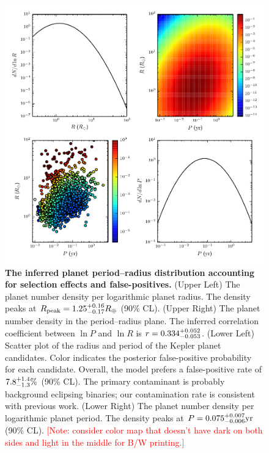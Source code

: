 \documentclass{nature}
\newcommand{\Rpeak}{R_\mathrm{peak}}
\newcommand{\REarth}{R_\oplus}
\newcommand{\ilya}[1]{\textcolor{red}{#1}}
\begin{document}
\begin{figure}
  \includegraphics[width=\columnwidth]{foreground-dist}
  \caption{\label{fig:foreground-dist} \textbf{The inferred planet
      period--radius distribution accounting for selection effects and
      false-positives.}  (Upper Left) The planet number density per
    logarithmic planet radius.  The density peaks at $\Rpeak =
    \rpeakrange \REarth$ (90\% CL).  (Upper Right) The planet
    number density in the period--radius plane.  The inferred
    correlation coefficient between $\ln P$ and $\ln R$ is $r =
    0.334_{-0.053}^{+0.052}$.  (Lower Left) Scatter plot of the radius
    and period of the Kepler planet candidates.  Color indicates the
    posterior false-positive probability for each candidate.  Overall,
    the model prefers a false-positive rate of $7.8_{-1.3}^{+1.4}\%$
    (90\% CL).  The primary contaminant is probably background
    eclipsing binaries; our contamination rate is consistent with
    previous work\cite{Fressin2013}. (Lower Right) The planet
    number density per logarithmic planet period.  The density peaks
    at $P = 0.075_{-0.006}^{+0.007} \mathrm{yr}$ (90\% CL). \ilya{[Note: consider color map that doesn't have dark on both sides and light in the middle for B/W printing.]}}
\end{figure}
\end{document}

